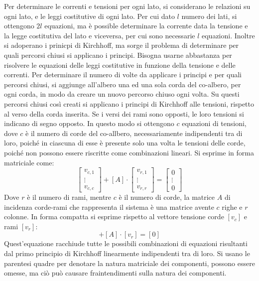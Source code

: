 \documentclass{article}
\numberwithin{equation}{subsection}
\begin{document}
Per determinare le correnti e tensioni per ogni lato, si considerano le relazioni su ogni lato, e le leggi costitutive di ogni lato. Per cui dato $l$ numero dei lati, si 
ottengono $2l$ equazioni, ma è possible determinare la corrente data la tensione e la legge costitutiva del lato e viceversa, per cui sono necessarie $l$ equazioni. 
Inoltre si adoperano i prinicpi di Kirchhoff, ma sorge il problema di determinare per quali percorsi chiusi si applicano i principi. Bisogna usarne abbastanza per risolvere le 
equazioni delle leggi costitutive in funzione della tensione e delle correnti. Per determinare il numero di volte da applicare i principi e per quali percorsi chiusi, si 
aggiunge all'albero una ed una sola corda del co-albero, per ogni corda, in modo da creare un nuovo percorso chiuso ogni volta. Su questi percorsi chiusi così creati si 
applicano i principi di Kirchhoff alle tensioni, rispetto al verso della corda inserita. Se i versi dei rami sono opposti, le loro tensioni si indicano di segno opposto. 
In questo modo si ottengono $c$ equazioni di tensioni, dove $c$ è il numero di corde del co-allbero, necessariamente indipendenti tra di loro, poiché in ciascuna di esse è 
presente solo una volta le tensioni delle corde, poiché non possono essere riscritte come combinazioni lineari. Si esprime in forma matriciale come:
\begin{equation*}
    \begin{bmatrix}
        v_{c,1}\\
        \vdots\\
        v_{c,c}
    \end{bmatrix}+[A]\cdot\begin{bmatrix}
        v_{r,1}\\
        \vdots\\
        v_{r,r}
    \end{bmatrix}=
    \begin{bmatrix}
        0\\
        \vdots\\
        0
    \end{bmatrix}
\end{equation*}
Dove $r$ è il numero di rami, mentre $c$ è il numero di corde, la matrice $A$ di incidenza corde-rami che rappresenta il sistema è una matrice avente $c$ righe e $r$ colonne. 
In forma compatta si esprime rispetto al vettore tensione corde $[v_c]$ e rami $[v_r]$:
\begin{equation*}
    [v_c]+[A]\cdot[v_r]=[0]
\end{equation*}
Quest'equazione racchiude tutte le possibili combinazioni di equazioni risultanti dal primo principio di Kirchhoff linearmente indipendenti tra di loro. 
Si usano le parentesi quadre per denotare la natura matriciale dei componenti, possono essere omesse, ma ciò può causare fraintendimenti sulla natura dei componenti. 
\end{document}

